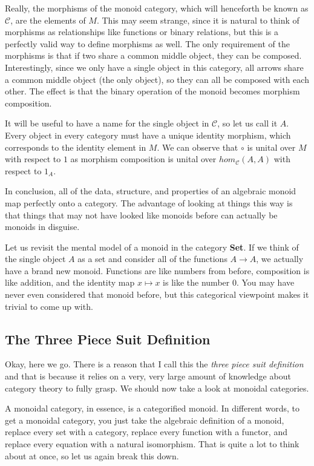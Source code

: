 \documentclass{article}
\begin{document}
Really, the morphisms of the monoid category, which will henceforth be known as
$\mathcal{C}$, are the elements of $M$. This may seem strange, since it is
natural to think of morphisms as relationships like functions or binary
relations, but this is a perfectly valid way to define morphisms as well. The
only requirement of the morphisms is that if two share a common middle object,
they can be composed. Interestingly, since we only have a single object in this
category, all arrows share a common middle object (the only object), so they
can all be composed with each other. The effect is that the binary operation of
the monoid becomes morphism composition.

It will be useful to have a name for the single object in $\mathcal{C}$, so let
us call it $A$. Every object in every category must have a unique identity
morphism, which corresponds to the identity element in $M$. We can observe that
$\circ$ is unital over $M$ with respect to $1$ as morphism composition is
unital over $hom_\mathcal{C}(A, A)$ with respect to $1_A$.

In conclusion, all of the data, structure, and properties of an algebraic
monoid map perfectly onto a category. The advantage of looking at things this
way is that things that may not have looked like monoids before can actually be
monoids in disguise.

Let us revisit the mental model of a monoid in the category \textbf{Set}. If we
think of the single object $A$ as a set and consider all of the functions $A
\to A$, we actually have a brand new monoid. Functions are like numbers from
before, composition is like addition, and the identity map $x \mapsto x$ is
like the number $0$. You may have never even considered that monoid before, but
this categorical viewpoint makes it trivial to come up with.

\subsection{The Three Piece Suit Definition}

Okay, here we go. There is a reason that I call this the \textit{three piece
suit definition} and that is because it relies on a very, very large amount of
knowledge about category theory to fully grasp. We should now take a look at
monoidal categories.

A monoidal category, in essence, is a categorified monoid. In different words,
to get a monoidal category, you just take the algebraic definition of a monoid,
replace every set with a category, replace every function with a functor, and
replace every equation with a natural isomorphism. That is quite a lot to think
about at once, so let us again break this down.
\end{document}
